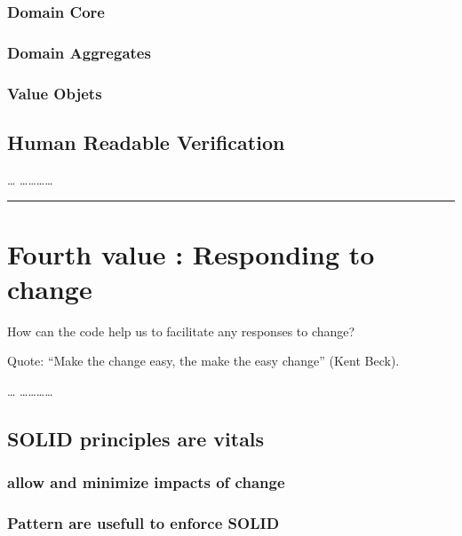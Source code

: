 \subsubsection{Domain Core}\label{domain-core}

\subsubsection{Domain Aggregates}\label{domain-aggregates}

\subsubsection{Value Objets}\label{value-objets}

\subsection{Human Readable
Verification}\label{human-readable-verification}

\ldots{} \ldots{}\ldots{}\ldots{}\ldots{}

\begin{center}\rule{3in}{0.4pt}\end{center}

\section{Fourth value : Responding to
change}\label{fourth-value-responding-to-change}

How can the code help us to facilitate any responses to change?

Quote: ``Make the change easy, the make the easy change'' (Kent Beck).

\ldots{} \ldots{}\ldots{}\ldots{}\ldots{}

\subsection{SOLID principles are
vitals}\label{solid-principles-are-vitals}

\subsubsection{allow and minimize impacts of
change}\label{allow-and-minimize-impacts-of-change}

\subsubsection{Pattern are usefull to enforce
SOLID}\label{pattern-are-usefull-to-enforce-solid}

